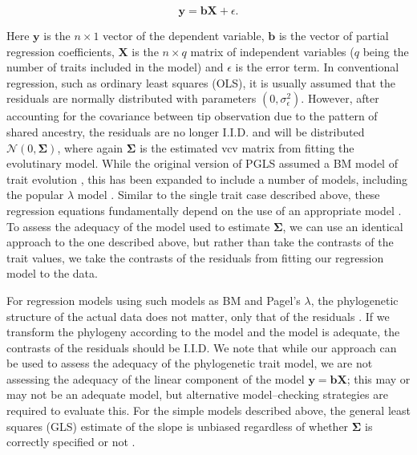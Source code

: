 \documentclass[a4paper,12pt]{article}
\begin{document}
\begin{equation}
\mathbf{y} = \mathbf{b}\mathbf{X} + \epsilon .
\end{equation}

Here $\mathbf{y}$ is the $n \times 1$ vector of the dependent variable, $\mathbf{b}$ is the vector of partial regression coefficients, $\mathbf{X}$ is the $n \times q$ matrix of independent variables ($q$ being the number of traits included in the model) and $\epsilon$ is the error term. In conventional regression, such as ordinary least squares (OLS), it is usually assumed that the residuals are normally distributed with parameters $(0, \sigma_\epsilon^2)$. However, after accounting for the covariance between tip observation due to the pattern of shared ancestry, the residuals are no longer I.I.D. and will be distributed $\mathcal{N} (0, \mathbf{\Sigma})$, where again $\mathbf{\Sigma}$ is the estimated vcv matrix from fitting the evolutinary model. While the original version of PGLS assumed a BM model of trait evolution \citep[in which case it is equivalent to fitting a regression between the contrasts of the two traits][]{Blomberg2012}, this has been expanded to include a number of models, including the popular $\lambda$ model \citep{Pagel1999, Freckleton2002} \citep[see also][]{Lynch1991, Housworth2004, Hadfield2010}. Similar to the single trait case described above, these regression equations fundamentally depend on the use of an appropriate model \citep{Hansen2012}. To assess the adequacy of the model used to estimate $\mathbf{\Sigma}$, we can use an identical approach to the one described above, but rather than take the contrasts of the trait values, we take the contrasts of the residuals from fitting our regression model to the data.

For regression models using such models as BM and Pagel's $\lambda$, the phylogenetic structure of the actual data does not matter, only that of the residuals \citep{Rohlf2001, Revell2010}. If we transform the phylogeny according to the model and the model is adequate, the contrasts of the residuals should be I.I.D. We note that while our approach can be used to assess the adequacy of the phylogenetic trait model, we are not assessing the adequacy of the linear component of the model $\mathbf{y} = \mathbf{b}\mathbf{X}$; this may or may not be an adequate model, but alternative model--checking strategies are required to evaluate this. For the simple models described above, the general least squares (GLS) estimate of the slope is unbiased regardless of whether $\mathbf{\Sigma}$ is correctly specified or not \citep{Rao1999}.
\end{document}
